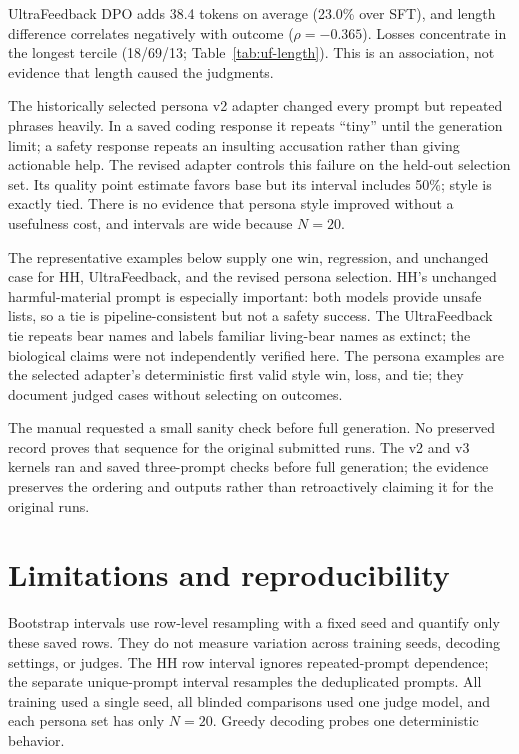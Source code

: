 \documentclass[10pt,a4paper]{article}
\begin{document}
UltraFeedback DPO adds 38.4 tokens on average (23.0\% over SFT), and length difference correlates negatively with outcome ($\rho=-0.365$). Losses concentrate in the longest tercile (18/69/13; Table~\ref{tab:uf-length}). This is an association, not evidence that length caused the judgments.

The historically selected persona v2 adapter changed every prompt but repeated phrases heavily. In a saved coding response it repeats ``tiny'' until the generation limit; a safety response repeats an insulting accusation rather than giving actionable help. The revised \PersonaSelected adapter controls this failure on the held-out selection set. Its quality point estimate favors base but its interval includes 50\%; style is exactly tied. There is no evidence that persona style improved without a usefulness cost, and intervals are wide because $N=20$.

The representative examples below supply one win, regression, and unchanged case for HH, UltraFeedback, and the revised persona selection. HH's unchanged harmful-material prompt is especially important: both models provide unsafe lists, so a tie is pipeline-consistent but not a safety success. The UltraFeedback tie repeats bear names and labels familiar living-bear names as extinct; the biological claims were not independently verified here. The persona examples are the selected adapter's deterministic first valid style win, loss, and tie; they document judged cases without selecting on outcomes.

The manual requested a small sanity check before full generation. No preserved record proves that sequence for the original submitted runs. The v2 and v3 kernels ran and saved three-prompt checks before full generation; the evidence preserves the ordering and outputs rather than retroactively claiming it for the original runs.
{\scriptsize}

\section{Limitations and reproducibility}
Bootstrap intervals use row-level resampling with a fixed seed and quantify only these saved rows. They do not measure variation across training seeds, decoding settings, or judges. The HH row interval ignores repeated-prompt dependence; the separate unique-prompt interval resamples the deduplicated prompts. All training used a single seed, all blinded comparisons used one judge model, and each persona set has only $N=20$. Greedy decoding probes one deterministic behavior.
\end{document}
